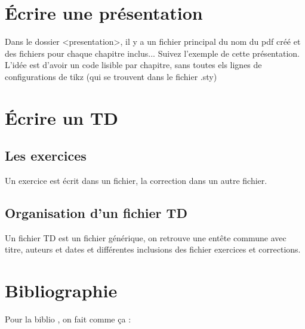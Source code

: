 \documentclass[./beamerCoursIsenLaTeX.tex]{subfiles}
\begin{document}
\section{Écrire une présentation}
\begin{frame}
Dans le dossier <presentation>, il y a un fichier principal du nom du pdf créé et des fichiers pour chaque chapitre inclus... Suivez l'exemple de cette présentation. L'idée est d'avoir un code lisible par chapitre, sans toutes els lignes de configurations de tikz (qui se trouvent dans le fichier .sty)
\end{frame}
\section{Écrire un TD}
\subsection{Les exercices}
\begin{frame}
  Un exercice est écrit dans un fichier, la correction dans un autre fichier.
\end{frame}
\subsection{Organisation d'un fichier TD}
\begin{frame}
Un fichier TD est un fichier générique, on retrouve une entête commune avec titre, auteurs et dates et différentes inclusions des fichier exercices et corrections.
\end{frame}
\section{Bibliographie}
\begin{frame}
Pour la biblio \cite{Luncheonmeat,Hunger}, on fait comme ça : 


\end{frame}
\end{document}
